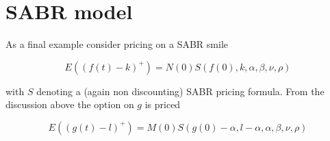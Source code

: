 \documentclass{amsart}
\theoremstyle{plain}
\numberwithin{equation}{section}
\begin{document}
\section{SABR model}

As a final example consider pricing on a SABR smile

\begin{equation}
E( (f(t)-k)^+ ) = N(0) S(f(0),k,\alpha,\beta,\nu,\rho)
\end{equation}

with $S$ denoting a (again non discounting) SABR pricing formula. From the discussion above the option on $g$ is priced

\begin{equation}
E( (g(t)-l)^+ ) = M(0) S(g(0)-\alpha, l-\alpha, \alpha, \beta, \nu, \rho)
\end{equation}
\end{document}
